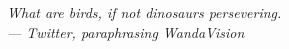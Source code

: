 \thispagestyle{empty}
{}

\vspace*{3cm}

\begin{center}
    \large\emph{What are birds, if not dinosaurs persevering.\\
    \medskip
    --- Twitter, paraphrasing WandaVision}
    
\end{center}